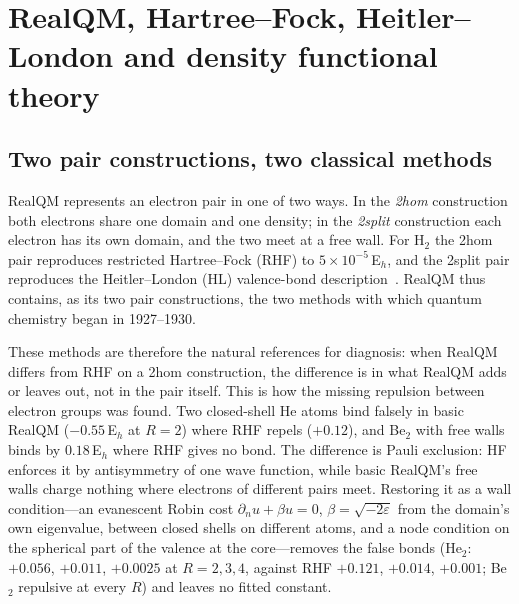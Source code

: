 \documentclass[11pt]{article}
\begin{document}
\section{RealQM, Hartree--Fock, Heitler--London and density functional theory}
\label{sec:compare}

\subsection{Two pair constructions, two classical methods}

RealQM represents an electron pair in one of two ways. In the \emph{2hom} construction both electrons
share one domain and one density; in the \emph{2split} construction each electron has its own domain,
and the two meet at a free wall. For H$_2$ the 2hom pair reproduces restricted Hartree--Fock (RHF)
to $5\times10^{-5}$\,E$_h$, and the 2split pair reproduces the Heitler--London (HL) valence-bond
description~\cite{hl,hartree,fock}. RealQM thus contains, as its two pair constructions, the two methods
with which quantum chemistry began in 1927--1930.

These methods are therefore the natural references for diagnosis: when RealQM differs from RHF on a
2hom construction, the difference is in what RealQM adds or leaves out, not in the pair itself. This is
how the missing repulsion between electron groups was found. Two closed-shell He atoms bind falsely in
basic RealQM ($-0.55$\,E$_h$ at $R=2$) where RHF repels ($+0.12$), and Be$_2$ with free walls binds
by $0.18$\,E$_h$ where RHF gives no bond. The difference is Pauli exclusion: HF enforces it by
antisymmetry of one wave function, while basic RealQM's free walls charge nothing where electrons of different
pairs meet. Restoring it as a wall condition---an evanescent Robin cost
$\partial_n u+\beta u=0$, $\beta=\sqrt{-2\varepsilon}$ from the domain's own eigenvalue, between closed
shells on different atoms, and a node condition on the spherical part of the valence at the core---removes
the false bonds (He$_2$: $+0.056$, $+0.011$, $+0.0025$ at $R=2,3,4$, against RHF $+0.121$, $+0.014$, $+0.001$; Be$_2$ repulsive at every $R$) and
leaves no fitted constant.
\end{document}
